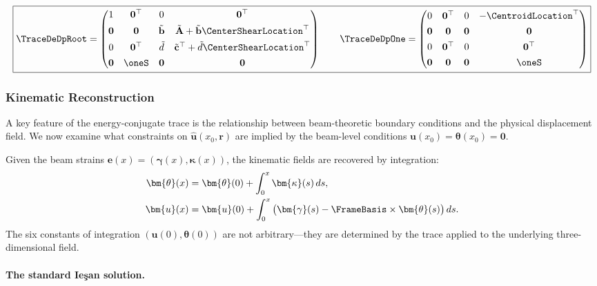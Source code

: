 \begin{equation}
\boxed{\TraceDeDpRoot = \begin{pmatrix}
1 & \mathbf{0}^\top & 0 & \mathbf{0}^\top \\[4pt]
\mathbf{0} & \mathbf{0} & \tilde{\mathbf{b}} & \tilde{\mathbf{A}} + \tilde{\mathbf{b}}\CenterShearLocation^\top \\[4pt]
0 & \mathbf{0}^\top & \tilde{d} & \tilde{\mathbf{c}}^\top + \tilde{d}\CenterShearLocation^\top \\[4pt]
\mathbf{0} & \oneS & \mathbf{0} & \mathbf{0}
\end{pmatrix}
\qquad 
\TraceDeDpOne = \begin{pmatrix}
0 & \mathbf{0}^\top & 0 & -\CentroidLocation^\top \\[4pt]
\mathbf{0} & \mathbf{0} & \mathbf{0} & \mathbf{0} \\[4pt]
0 & \mathbf{0}^\top & 0 & \mathbf{0}^\top \\[4pt]
\mathbf{0} & \mathbf{0} & \mathbf{0} & \oneS
\end{pmatrix}}
\end{equation}


\subsubsection{Kinematic Reconstruction}

A key feature of the energy-conjugate trace is the relationship between 
beam-theoretic boundary conditions and the physical displacement field. 
We now examine what constraints on $\hat{\bm{u}}(x_0, \bm{r})$ are implied 
by the beam-level conditions $\bm{u}(x_0) = \bm{\theta}(x_0) = \mathbf{0}$.

Given the beam strains $\bm{e}(x) = (\bm{\gamma}(x), \bm{\kappa}(x))$, the 
kinematic fields are recovered by integration:
\begin{align}
\bm{\theta}(x) &= \bm{\theta}(0) + \int_0^x \bm{\kappa}(s)\,ds, \\
\bm{u}(x) &= \bm{u}(0) + \int_0^x \big(\bm{\gamma}(s) - \FrameBasis \times \bm{\theta}(s)\big)\,ds.
\end{align}
The six constants of integration $(\bm{u}(0), \bm{\theta}(0))$ are not 
arbitrary---they are determined by the trace applied to the underlying 
three-dimensional field.

\paragraph{The standard Ieşan solution.}


